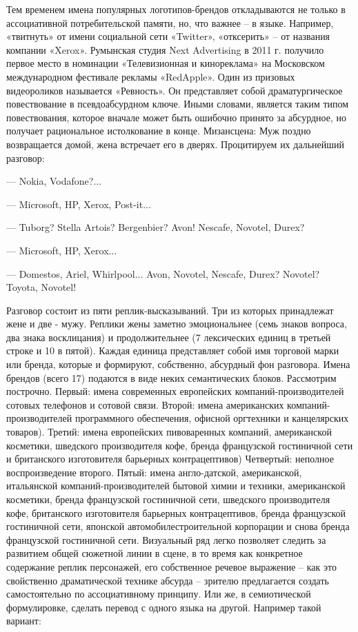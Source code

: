 Тем временем имена популярных логотипов-брендов откладываются не только в ассоциативной потребительской памяти, но, что важнее -- в языке.  Например,  «твитнуть» от имени социальной сети «Twitter», «отксерить» -- от названия компании «Xerox». Румынская студия Next Advertising в 2011 г. получило первое место в номинации «Телевизионная и кинореклама» на Московском международном фестивале рекламы «RedApple». Один из призовых видеороликов называется «Ревность». Он представляет собой драматургическое повествование в псевдоабсурдном ключе. Иными словами, является таким типом повествования, которое вначале может быть ошибочно принято за абсурдное, но получает рациональное истолкование в конце.\autocite{ivleva_thesis}
Мизансцена: Муж поздно возвращается домой, жена встречает его в дверях. Процитируем их дальнейший разговор:

— Nokia, Vodafone?...

— Microsoft, HP, Xerox, Post-it...

— Tuborg? Stella Artois? Bergenbier? Avon! Nescafe, Novotel, Durex?

— Microsoft, HP, Xerox...

— Domestos, Ariel, Whirlpool... Avon, Novotel, Nescafe, Durex? Novotel? Toyota, Novotel!

Разговор состоит из пяти реплик-высказываний. Три из которых принадлежат жене и две - мужу. Реплики жены заметно эмоциональнее (семь знаков вопроса, два знака восклицания) и продолжительнее (7 лексических единиц в третьей строке и 10 в пятой). Каждая единица представляет собой имя торговой марки или бренда, которые и формируют, собственно, абсурдный фон разговора. Имена брендов (всего 17) подаются в виде неких семантических блоков. Рассмотрим построчно.
Первый: имена современных европейских компаний-производителей сотовых телефонов и сотовой связи.
Второй: имена американских компаний-производителей программного обеспечения, офисной оргтехники и канцелярских товаров).
Третий: имена европейских пивоваренных компаний, американской косметики, шведского производителя кофе, бренда французской гостиничной сети и британского изготовителя барьерных контрацептивов)
Четвертый: неполное воспроизведение второго.
Пятый: имена англо-датской, американской, итальянской компаний-производителей бытовой химии и техники, американской косметики, бренда французской гостиничной сети, шведского производителя кофе, британского изготовителя барьерных контрацептивов, бренда французской гостиничной сети, японской автомобилестроительной корпорации и снова бренда французской гостиничной сети.
Визуальный ряд легко позволяет следить за развитием общей сюжетной линии в сцене, в то время как конкретное содержание реплик персонажей, его собственное речевое выражение – как это свойственно драматической технике абсурда – зрителю предлагается создать самостоятельно по ассоциативному принципу. \autocite[][189-209]{stern1990} \autocite[][72-81]{stern1992} \autocite[][35-49]{arias2000} Или же, в семиотической формулировке, сделать перевод с одного языка на другой. Например такой вариант:

